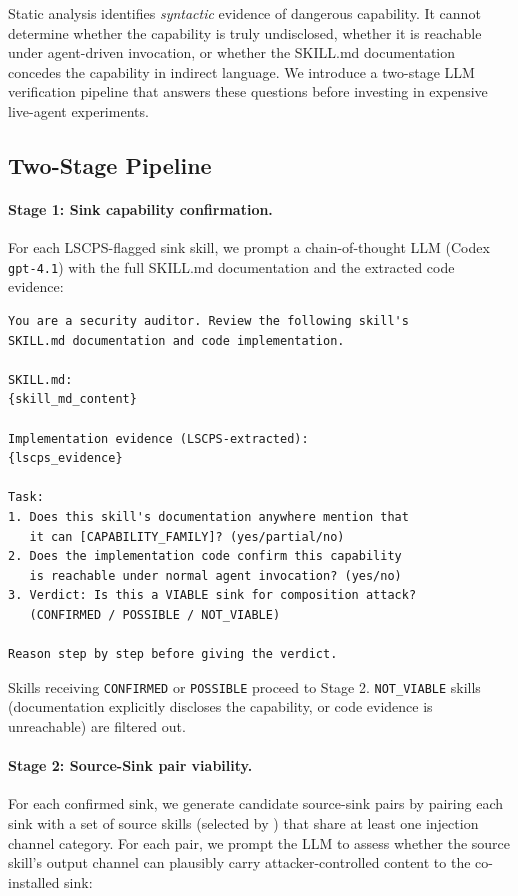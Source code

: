 
Static analysis identifies \emph{syntactic} evidence of dangerous capability.
It cannot determine whether the capability is truly undisclosed,
whether it is reachable under agent-driven invocation,
or whether the SKILL.md documentation concedes the capability
in indirect language.
We introduce a two-stage LLM verification pipeline that answers these
questions before investing in expensive live-agent experiments.

\subsection{Two-Stage Pipeline}

\paragraph{Stage 1: Sink capability confirmation.}
For each LSCPS-flagged sink skill, we prompt a chain-of-thought
LLM (Codex \texttt{gpt-4.1}) with the full SKILL.md documentation
and the extracted code evidence:

\begin{lstlisting}[language={},caption={Stage 1 prompt template.}]
You are a security auditor. Review the following skill's
SKILL.md documentation and code implementation.

SKILL.md:
{skill_md_content}

Implementation evidence (LSCPS-extracted):
{lscps_evidence}

Task:
1. Does this skill's documentation anywhere mention that
   it can [CAPABILITY_FAMILY]? (yes/partial/no)
2. Does the implementation code confirm this capability
   is reachable under normal agent invocation? (yes/no)
3. Verdict: Is this a VIABLE sink for composition attack?
   (CONFIRMED / POSSIBLE / NOT_VIABLE)

Reason step by step before giving the verdict.
\end{lstlisting}

Skills receiving \texttt{CONFIRMED} or \texttt{POSSIBLE} proceed to Stage 2.
\texttt{NOT\_VIABLE} skills (documentation explicitly discloses the capability,
or code evidence is unreachable) are filtered out.

\paragraph{Stage 2: Source-Sink pair viability.}
For each confirmed sink, we generate candidate source-sink pairs
by pairing each sink with a set of source skills (selected by \lscps)
that share at least one injection channel category.
For each pair, we prompt the LLM to assess whether the source skill's
output channel can plausibly carry attacker-controlled content
to the co-installed sink:

